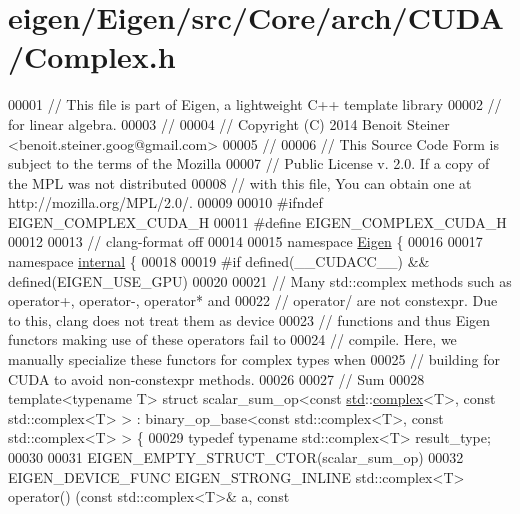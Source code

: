 \hypertarget{eigen_2_eigen_2src_2_core_2arch_2_c_u_d_a_2_complex_8h_source}{}\section{eigen/\+Eigen/src/\+Core/arch/\+C\+U\+D\+A/\+Complex.h}
\label{eigen_2_eigen_2src_2_core_2arch_2_c_u_d_a_2_complex_8h_source}

\begin{DoxyCode}
00001 \textcolor{comment}{// This file is part of Eigen, a lightweight C++ template library}
00002 \textcolor{comment}{// for linear algebra.}
00003 \textcolor{comment}{//}
00004 \textcolor{comment}{// Copyright (C) 2014 Benoit Steiner <benoit.steiner.goog@gmail.com>}
00005 \textcolor{comment}{//}
00006 \textcolor{comment}{// This Source Code Form is subject to the terms of the Mozilla}
00007 \textcolor{comment}{// Public License v. 2.0. If a copy of the MPL was not distributed}
00008 \textcolor{comment}{// with this file, You can obtain one at http://mozilla.org/MPL/2.0/.}
00009 
00010 \textcolor{preprocessor}{#ifndef EIGEN\_COMPLEX\_CUDA\_H}
00011 \textcolor{preprocessor}{#define EIGEN\_COMPLEX\_CUDA\_H}
00012 
00013 \textcolor{comment}{// clang-format off}
00014 
00015 \textcolor{keyword}{namespace }\hyperlink{namespace_eigen}{Eigen} \{
00016 
00017 \textcolor{keyword}{namespace }\hyperlink{namespaceinternal}{internal} \{
00018 
00019 \textcolor{preprocessor}{#if defined(\_\_CUDACC\_\_) && defined(EIGEN\_USE\_GPU)}
00020 
00021 \textcolor{comment}{// Many std::complex methods such as operator+, operator-, operator* and}
00022 \textcolor{comment}{// operator/ are not constexpr. Due to this, clang does not treat them as device}
00023 \textcolor{comment}{// functions and thus Eigen functors making use of these operators fail to}
00024 \textcolor{comment}{// compile. Here, we manually specialize these functors for complex types when}
00025 \textcolor{comment}{// building for CUDA to avoid non-constexpr methods.}
00026 
00027 \textcolor{comment}{// Sum}
00028 \textcolor{keyword}{template}<\textcolor{keyword}{typename} T> \textcolor{keyword}{struct }scalar\_sum\_op<const \hyperlink{namespacestd}{std}::\hyperlink{structcomplex}{complex}<T>, const std::complex<T> > : 
      binary\_op\_base<const std::complex<T>, const std::complex<T> > \{
00029   \textcolor{keyword}{typedef} \textcolor{keyword}{typename} std::complex<T> result\_type;
00030 
00031   EIGEN\_EMPTY\_STRUCT\_CTOR(scalar\_sum\_op)
00032   EIGEN\_DEVICE\_FUNC EIGEN\_STRONG\_INLINE std::complex<T> operator() (\textcolor{keyword}{const} std::complex<T>& a, \textcolor{keyword}{const} 

\end{DoxyCode}
